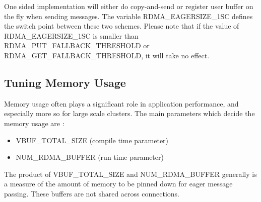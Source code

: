 One sided implementation will either do copy-and-send or register user
buffer on the fly when sending messages. The variable 
RDMA\_EAGERSIZE\_1SC defines the switch point
between these two schemes. Please note that if the value 
of RDMA\_EAGERSIZE\_1SC is smaller
than\\ RDMA\_PUT\_FALLBACK\_THRESHOLD or RDMA\_GET\_FALLBACK\_THRESHOLD, it
will take no effect.


\subsection{Tuning Memory Usage}

Memory usage often plays a significant role in application performance,
and especially more so for large scale clusters. 
The main parameters which decide the memory usage are : 
 \begin{itemize}
\item VBUF\_TOTAL\_SIZE (compile time parameter)
\item NUM\_RDMA\_BUFFER (run time parameter)
 \end{itemize}

The product of VBUF\_TOTAL\_SIZE and 
NUM\_RDMA\_BUFFER generally is a measure of the amount of memory
to be pinned down for eager message passing. These buffers are not
shared across connections.
